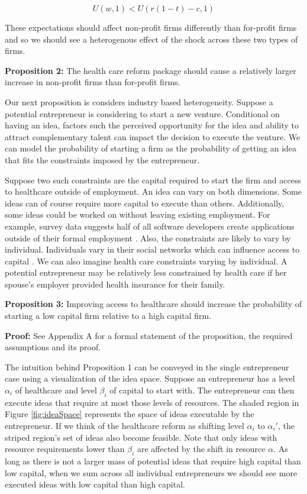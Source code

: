 \documentclass[12pt]{article}
\begin{document}
$$U(w,1) < U(r(1-t)-c,1)$$

These expectations should affect non-profit firms differently than for-profit firms and so we should see a heterogenous effect of the shock across these two types of firms. 

\textbf{Proposition 2:} 
The health care reform package should cause a relatively larger increase in non-profit firms than for-profit firms. 

Our next proposition is considers industry based heterogeneity. Suppose a potential entrepreneur is considering to start a new venture. Conditional on having an idea, factors such the perceived opportunity for the idea \cite{sorensenSorensen} and ability to attract complementary talent \cite{stuartSorensen} can impact the decision to execute the venture. We can model the probability of starting a firm as the probability of getting an idea that fits the constraints imposed by the entrepreneur. 

Suppose two such constraints are the capital required to start the firm and access to healthcare  outside of employment. An idea can vary on both dimensions. Some ideas can of course require more capital to execute than others. Additionally, some ideas could be worked on without leaving existing employment. For example, survey data suggests half of all software developers create applications outside of their formal employment \cite{evans}. Also, the constraints are likely to vary by individual. Individuals vary in their social networks which can influence access to capital \cite{uzzi}. We can also imagine health care constraints varying by individual. A potential entrepreneur may be relatively less constrained by health care if her spouse's employer provided health insurance for their family. 

\textbf{Proposition 3:} 
Improving access to healthcare should increase the probability of starting a low capital firm relative to a high capital firm. 

\textbf{Proof:}
See Appendix A for a formal statement of the proposition, the required assumptions and its proof. 

The intuition behind Proposition 1 can be conveyed in the single entrepreneur case using a visualization of the idea space. Suppose an entrepreneur has a level $\alpha_i$ of healthcare and level $\beta_i$ of capital to start with. The entrepreneur can then execute ideas that require at most those levels of resources. The shaded region in Figure \ref{fig:ideaSpace} represents the space of ideas executable by the entrepreneur. If we think of the healthcare reform as shifting level $\alpha_i$ to $\alpha_i'$, the striped region's set of ideas also become feasible. Note that only ideas with resource requirements lower than $\beta_i$ are affected by the shift in resource $\alpha$. As long as there is not a larger mass of potential ideas that require high capital than low capital, when we sum across all individual entrepreneurs we should see more executed ideas with low capital than high capital. 
\end{document}
